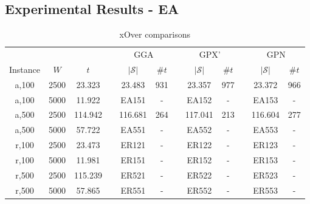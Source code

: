 \documentclass{elsarticle}
\begin{document}
\subsection{Experimental Results - EA}
\label{sub:expea}

\begin{table}[h!]
	\centering
	\caption{xOver comparisons}
	\begin{tabular}{cccccccccccc}\toprule
		& & & &\multicolumn{2}{c}{GGA} &\phantom{a}& \multicolumn{2}{c}{GPX'} &\phantom{a}& \multicolumn{2}{c}{GPN}\\
		\cmidrule{5-6} \cmidrule{8-9} \cmidrule{11-12}
		Instance & $W$ & $t$ && $|\mathcal{S}|$ & $\# t$ && $|\mathcal{S}|$ & $\# t$ && $|\mathcal{S}|$ & $\# t$ \\ \midrule	
		a,100 & 2500 & 23.323 && 23.483 & 931 && 23.357 & 977 && 23.372 & 966 \\
		a,100 & 5000 & 11.922 && EA151 & - && EA152 & - && EA153 & -\\
		\midrule
		a,500 & 2500 & 114.942 && 116.681 & 264 && 117.041 & 213 && 116.604 & 277 \\
		a,500 & 5000 & 57.722 && EA551 & - && EA552 & - && EA553 & -\\
		\midrule
		\midrule
		r,100 & 2500 & 23.473 && ER121 & - && ER122 & - && ER123 & -\\
		r,100 & 5000 & 11.981 && ER151 & - && ER152 & - && ER153 & -\\
		\midrule
		r,500 & 2500 & 115.239 && ER521 & - && ER522 & - && ER523 & -\\
		r,500 & 5000 & 57.865 && ER551 & - && ER552 & - && ER553 & -\\
		\bottomrule
	\end{tabular}	
	\label{table:EA}
\end{table}
\end{document}
